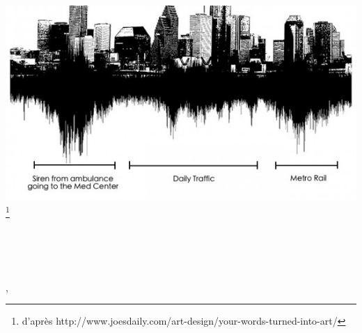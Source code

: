 \begin{titlepage}
    \begin{addmargin}[-1cm]{-3cm}
    \begin{center}
        \large  

        \hfill

        \vfill

        \begingroup
            \color{Maroon}\spacedallcaps{\myTitle} \\ \bigskip
        \endgroup
		\medskip 
		\mySubtitle \\ \bigskip

		\vfill
		
        \includegraphics[scale=.5]{gfx/citySound.jpg}\footnote{d'après http://www.joesdaily.com/art-design/your-words-turned-into-art/} \\ \medskip
		
		\vfill
		
        \spacedlowsmallcaps{\myName}

        \vfill
        
        \myDegree \\ \bigskip
        
        \myDepartment \\                            
        \myFaculty \\
        \myUni , \myLocation\\ \bigskip
		
		\vfill 
		
        \myTime 

        \vfill                      

    \end{center}  
  \end{addmargin}       
\end{titlepage}   